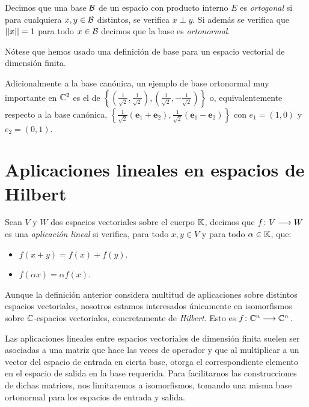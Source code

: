 \begin{definition} Decimos que una base $\mathcal{B}$ de un espacio con producto interno $E$ es \textit{ortogonal} si para cualquiera $x,y\in\mathcal{B}$ distintos, se verifica $x\perp y$. Si además se verifica que $\left|\left|x\right|\right|=1$ para todo $x\in\mathcal{B}$ decimos que la base es \textit{ortonormal}.

Nótese que hemos usado una definición de base para un espacio vectorial de dimensión finita.
\end{definition}

\begin{example} \label{ex:ex34} Adicionalmente a la base canónica, un ejemplo de base ortonormal muy importante en $\mathbb{C}^2$ es el de $\left\{\left(\frac{1}{\sqrt{2}},\frac{1}{\sqrt{2}}\right),\left(\frac{1}{\sqrt{2}},-\frac{1}{\sqrt{2}}\right)\right\}$ o, equivalentemente respecto a la base canónica, $\left\{\frac{1}{\sqrt{2}}\left(\textbf{e}_1 + \textbf{e}_2\right),\frac{1}{\sqrt{2}}\left(\textbf{e}_1 - \textbf{e}_2\right)\right\}$ con $e_1=(1,0)$ y $e_2=(0,1)$.
\end{example}

\section{Aplicaciones lineales en espacios de Hilbert}

\begin{definition} Sean $V$ y $W$ dos espacios vectoriales sobre el cuerpo $\mathbb{K}$, decimos que $f\colon V\longrightarrow W$ es una \textit{aplicación lineal} si verifica, para todo $x,y\in V$ y para todo $\alpha\in\mathbb{K}$, que:
\begin{itemize}
\item $f(x+y)=f(x)+f(y)$.
\item $f(\alpha x)=\alpha f(x)$.
\end{itemize}
\end{definition}

Aunque la definición anterior considera multitud de aplicaciones sobre distintos espacios vectoriales, nosotros estamos interesados únicamente en isomorfismos sobre $\mathbb{C}$-espacios vectoriales, concretamente de \textit{Hilbert}. Esto es $f\colon \mathbb{C}^n\longrightarrow \mathbb{C}^n$.

Las aplicaciones lineales entre espacios vectoriales de dimensión finita suelen ser asociadas a una matriz que hace las veces de operador y que al multiplicar a un vector del espacio de entrada en cierta base, otorga el correspondiente elemento en el espacio de salida en la base requerida. Para facilitarnos las construcciones de dichas matrices, nos limitaremos a isomorfismos, tomando una misma base ortonormal para los espacios de entrada y salida.

